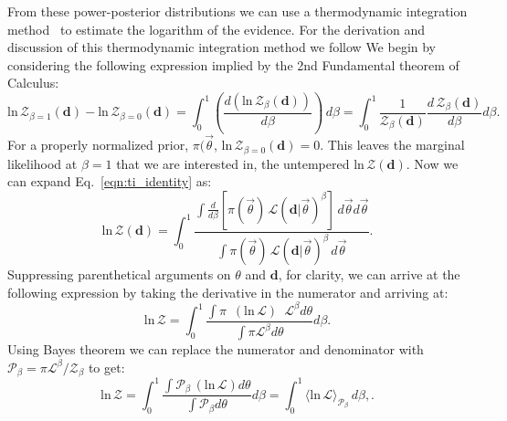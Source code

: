 From these power-posterior distributions we can use a thermodynamic integration method~\citep{lartillot2006computing,friel2008marginal} to estimate the logarithm of the evidence. For the derivation and discussion of this thermodynamic integration method we follow \citep{annis2019thermodynamic}
We begin by considering the following expression implied by the 2nd Fundamental theorem of Calculus:
\begin{equation}\label{eqn:ti_identity}
    \mathrm{ln} \, \mathcal{Z}_{\beta=1}\left(\mathbf{d}\right) - \mathrm{ln} \, \mathcal{Z}_{\beta=0}\left(\mathbf{d}\right) = \int^1_0 \left(\frac{d\left(\mathrm{ln} \, \mathcal{Z}_\beta \left(\mathbf{d}\right) \right)}{d\beta}\right) \, d\beta = \int^1_0 \frac{1}{\mathcal{Z}_\beta \left(\mathbf{d}\right)} \frac{d \, \mathcal{Z}_\beta \left(\mathbf{d}\right)}{d\beta} d\beta.
\end{equation}
For a properly normalized prior, $\pi(\vec{\theta}$, $\mathrm{ln} \, \mathcal{Z}_{\beta=0} \left(\mathbf{d}\right) = 0$. This leaves the marginal likelihood at $\beta=1$ that we are interested in, the untempered $\mathrm{ln} \, \mathcal{Z} \left(\mathbf{d}\right)$. Now we can expand Eq.~\ref{eqn:ti_identity} as:
\begin{equation}
    \mathrm{ln} \, \mathcal{Z} \left(\mathbf{d}\right) = \int_0^1 \frac{\int \frac{d}{d\beta} \left[\pi\left(\vec{\theta}\right) \, \mathcal{L} \left(\mathbf{d}|\vec{\theta} \right)^\beta \right]\, d\vec{\theta} d\vec{\theta}}{\int \pi\left(\vec{\theta}\right) \, \mathcal{L}\left(\mathbf{d}|\vec{\theta} \right)^\beta \, d\vec{\theta}}.
\end{equation}
Suppressing parenthetical arguments on $\theta$ and $\mathbf{d}$, for clarity, we can arrive at the following expression by taking the derivative in the numerator and arriving at:
\begin{equation}
    \mathrm{ln} \, \mathcal{Z} = \int^1_0 \frac{\int \pi \, \, \, \left(\mathrm{ln} \, \mathcal{L}\right) \, \, \, \mathcal{L}^{\beta} d\theta}{\int \pi \mathcal{L}^{\beta} d\theta} d\beta.
\end{equation}
Using Bayes theorem we can replace the numerator and denominator with $\mathcal{P}_\beta = \pi \mathcal{L}^\beta / \mathcal{Z}_\beta$ to get:
\begin{equation}
    \mathrm{ln} \, \mathcal{Z} = \int^1_0 \frac{\int \mathcal{P}_\beta \, \left(\mathrm{ln} \, \mathcal{L}\right) d\theta}{\int \mathcal{P}_\beta   d\theta} d\beta = \int^1_0 \langle \mathrm{ln} \, \mathcal{L} \rangle_{\mathcal{P}_\beta} \, d\beta,.
\end{equation}
